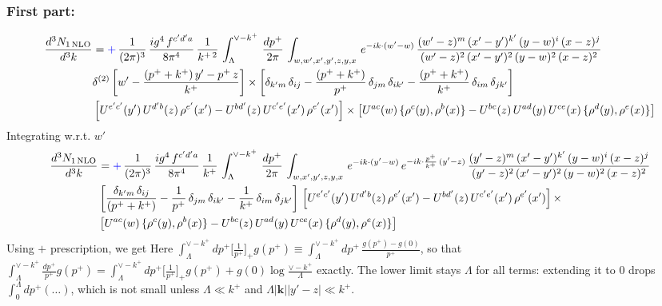 \documentclass[9pt]{article}
\numberwithin{equation}{section}
\begin{document}
\subsubsection{First part:\,}
\begin{align}
     \frac{d^{3}N_{1\,\rm NLO}}{d^{3}k} & = {\color{blue}+}\, \frac{1}{(2\pi)^{3}}\,\frac{ig^{4}\,f^{c'd'a}}{8\pi^{4}}\, \frac{1}{k^{+\,2}}\,\int_{\Lambda}^{\vee-k^{+}}\, \frac{dp^{+}}{2\pi}\, \int_{w,w',x',y',z,y,x}\, e^{-ik\cdot (w'-w)}\, \frac{(w'-z)^{m}\,(x'-y')^{k'}\,(y-w)^{i}\,(x-z)^{j}}{(w'-z)^{2}\,(x'-y')^{2}\,(y-w)^{2}\,(x-z)^{2}}\notag \\ & \delta^{(2)}\left[w'-\frac{(p^{+}+k^{+})\,y'-p^{+}\,z}{k^{+}}\right]\times \left[\delta_{k'm}\,\delta_{ij}-\frac{(p^{+}+k^{+})}{p^{+}}\,\delta_{jm}\,\delta_{ik'}-\frac{(p^{+}+k^{+})}{k^{+}}\, \delta_{im}\, \delta_{jk'}\right]\notag \\ & \left[U^{e'c'}(y')\,U^{d'b}(z)\,\rho^{e'}(x')-U^{bd'}(z)\,U^{c'e'}(x')\,\rho^{e'}(x')\right]\times \left[U^{ac}(w)\, \{\rho^{c}(y),\rho^{b}(x)\}-U^{bc}(z)\,U^{ad}(y)\,U^{ce}(x)\,\{\rho^{d}(y),\rho^{e}(x)\}\right]
\end{align}
Integrating w.r.t. $w'$
\begin{align}
     \frac{d^{3}N_{1\,\rm NLO}}{d^{3}k} & = {\color{blue}+}\,\frac{1}{(2\pi)^{3}}\, \frac{ig^{4}\,f^{c'd'a}}{8\pi^{4}}\, \frac{1}{k^{+}}\,\int_{\Lambda}^{\vee-k^{+}}\,  \frac{dp^{+}}{2\pi}\, \int_{w,x',y',z,y,x}\, e^{-ik\cdot (y'-w)}\, e^{-ik\cdot \frac{p^{+}}{k^{+}}\,(y'-z)}\,\frac{(y'-z)^{m}\,(x'-y')^{k'}\,(y-w)^{i}\,(x-z)^{j}}{(y'-z)^{2}\,(x'-y')^{2}\,(y-w)^{2}\,(x-z)^{2}}\notag \\ & \left[\frac{\delta_{k'm}\,\delta_{ij}}{(p^{+}+k^{+})}-\frac{1}{p^{+}}\,\delta_{jm}\,\delta_{ik'}-\frac{1}{k^{+}}\, \delta_{im}\, \delta_{jk'}\right]\, \left[U^{e'c'}(y')\,U^{d'b}(z)\,\rho^{e'}(x')-U^{bd'}(z)\,U^{c'e'}(x')\,\rho^{e'}(x')\right]\times\notag \\ &  \left[U^{ac}(w)\, \{\rho^{c}(y),\rho^{b}(x)\}-U^{bc}(z)\,U^{ad}(y)\,U^{ce}(x)\,\{\rho^{d}(y),\rho^{e}(x)\}\right]
\end{align} 
Using $+$ prescription, we get {\color{blue}Here $\int_{\Lambda}^{\vee-k^{+}}dp^{+}\big[\frac{1}{p^{+}}\big]_{+}g(p^{+})\equiv\int_{\Lambda}^{\vee-k^{+}}dp^{+}\,\frac{g(p^{+})-g(0)}{p^{+}}$, so that $\int_{\Lambda}^{\vee-k^{+}}\frac{dp^{+}}{p^{+}}g(p^{+})=\int_{\Lambda}^{\vee-k^{+}}dp^{+}\big[\frac{1}{p^{+}}\big]_{+}g(p^{+})+g(0)\log\frac{\vee-k^{+}}{\Lambda}$ exactly. The lower limit stays $\Lambda$ for all terms: extending it to $0$ drops $\int_0^\Lambda dp^+(\dots)$, which is not small unless $\Lambda\ll k^+$ and $\Lambda|\mathbf k||y'-z|\ll k^+$.}
\end{document}
